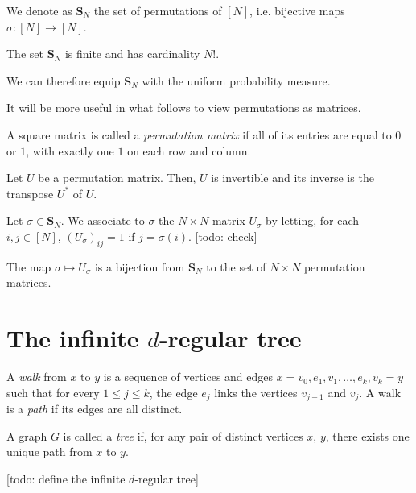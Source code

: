 \begin{definition}
  We denote as $\mathbf{S}_N$ the set of permutations of $[N]$, i.e. bijective maps $\sigma
  : [N] \rightarrow [N]$. 
\end{definition}

\begin{lemma}
  The set $\mathbf{S}_N$ is finite and has cardinality $N!$.
\end{lemma}
We can therefore equip $\mathbf{S}_N$ with the uniform probability measure.

It will be more useful in what follows to view permutations as matrices.

\begin{definition}
  A square matrix is called a \emph{permutation matrix} if all of its entries are equal to $0$ or
  $1$, with exactly one $1$ on each row and column.
\end{definition}

\begin{lemma}
  Let $U$ be a permutation matrix. Then, $U$ is invertible and its inverse is the transpose $U^*$ of $U$.
\end{lemma}

\begin{definition}
  Let $\sigma \in \mathbf{S}_N$. We associate to $\sigma$ the $N \times N$ matrix
  $U_\sigma$ by letting, for each $i, j \in [N]$, $(U_\sigma)_{ij} = 1$ if $j = \sigma(i)$. [todo: check]
\end{definition}

\begin{lemma}
  The map $\sigma \mapsto U_\sigma$ is a bijection from $\mathbf{S}_N$ to the set of $N \times N$
  permutation matrices.
\end{lemma}

\section{The infinite $d$-regular tree}

\begin{definition}
  A \emph{walk} from $x$ to $y$ is a sequence of vertices and edges
  $x = v_0, e_1, v_1, \ldots, e_k, v_k = y$ such that for every $1 \leq j \leq k$, the edge $e_j$
  links the vertices $v_{j-1}$ and $v_j$. A walk is a \emph{path} if its edges are all distinct.
\end{definition}

\begin{definition}
  A graph $G$ is called a \emph{tree} if, for any pair of distinct vertices $x$, $y$, there exists
  one unique path from $x$ to $y$.
\end{definition}

[todo: define the infinite $d$-regular tree]



